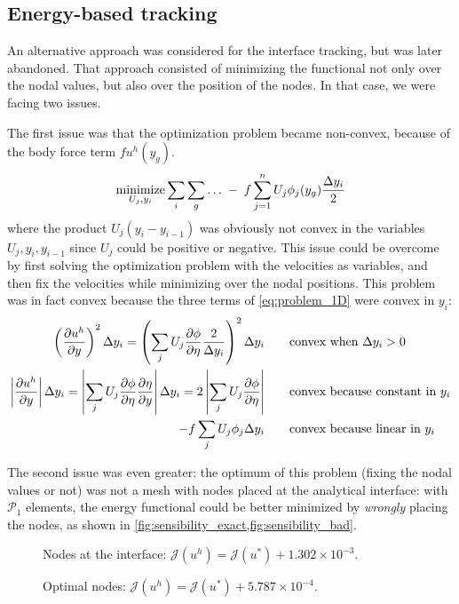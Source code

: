 \documentclass[11 pt]{report}
\begin{document}
\FloatBarrier
\subsection{Energy-based tracking}
An alternative approach was considered for the interface tracking, but was later abandoned. That approach consisted of minimizing the functional not only over the nodal values, but also over the position of the nodes. In that case, we were facing two issues. 

The first issue was that the optimization problem became non-convex, because of the body force term $fu^h(y_g)$.
\begin{equation}
    \operatorname*{minimize}_{U_j, y_i} \sum_{i} \sum_{g} \dots \; - \; f \sum_{j=1}^{n} U_{j} \phi_j(y_g) \frac{\Delta y_i}{2}
\end{equation}
where the product $U_j (y_{i}-y_{i-1})$ was obviously not convex in the variables $U_j, y_i, y_{i-1}$ since $U_j$ could be positive or negative. This issue could be overcome by first solving the optimization problem with the velocities as variables, and then fix the velocities while minimizing over the nodal positions. This problem was in fact convex because the three terms of \eqref{eq:problem_1D} were convex in $y_i$:
\begin{align}
    \left(\pdv{u^h}{y}\right)^2 \Delta y_{i} = \left(\sum_j U_j\pdv{\phi}{\eta} \frac{2}{\Delta y_i}\right)^2 \Delta y_{i} &\qquad \text{convex when } \Delta y_i > 0\\
    \left|\pdv{u^h}{y}\right| \Delta y_{i} = \left|\sum_j U_j\pdv{\phi}{\eta} \pdv{\eta}{y}\right| \Delta y_{i} = 2\left|\sum_j U_j\pdv{\phi}{\eta} \right| &\qquad \text{convex because constant in } y_i\\
    -f\sum_j U_j \phi_j \Delta y_i &\qquad \text{convex because linear in } y_i
\end{align}

The second issue was even greater: the optimum of this problem (fixing the nodal values or not) was not a mesh with nodes placed at the analytical interface: with $\mathcal{P}_1$ elements, the energy functional could be better minimized by \textit{wrongly} placing the nodes, as shown in \cref{fig:sensibility_exact,fig:sensibility_bad}.

\begin{figure}[!b]
    \centering
    
    \caption{Nodes at the interface: $\mathcal{J}(u^h) = \mathcal{J}(u^*) + 1.302\times 10^{-3}$.}
    \label{fig:sensibility_exact}
\end{figure}
\begin{figure}[!t]
    \centering
    
    \caption{Optimal nodes: $\mathcal{J}(u^h) = \mathcal{J}(u^*) + 5.787\times 10^{-4}$.}
    \label{fig:sensibility_bad}
\end{figure}
\end{document}
